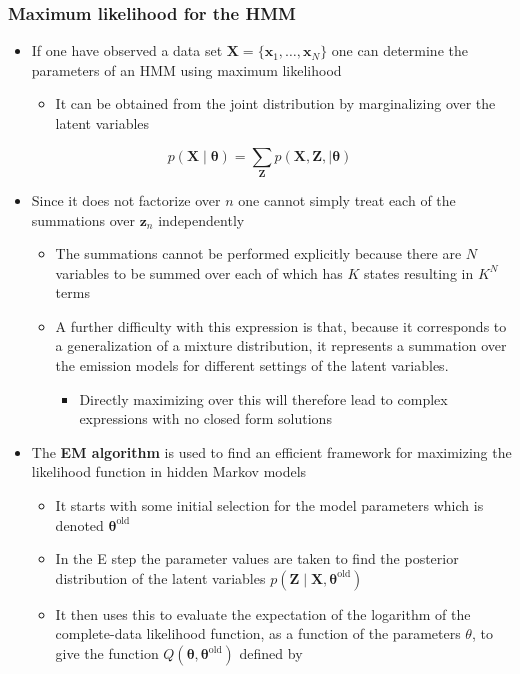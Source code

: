 \documentclass[11pt]{article}
\begin{document}
\subsubsection{Maximum likelihood for the HMM}
\label{sec:org84755cc}
\begin{itemize}
\item If one have observed a data set \(\pmb X = \{\pmb x_1, \dots, \pmb x_N\}\) one can determine the parameters of an HMM using maximum likelihood
\begin{itemize}
\item It can be obtained from the joint distribution by marginalizing over the latent variables
\end{itemize}
\end{itemize}
\begin{equation}
  p(\pmb X \mid \pmb \theta) = \sum_{\pmb Z} p(\pmb X, \pmb Z, \mid \pmb \theta)
\end{equation}
\begin{itemize}
\item Since it does not factorize over \(n\) one cannot simply treat each of the summations over \(\pmb z_n\) independently
\begin{itemize}
\item The summations cannot be performed explicitly because there are \(N\) variables to be summed over each of which has \(K\) states resulting in \(K^N\) terms
\item A further difficulty with this expression is that, because it corresponds to a generalization of a mixture distribution, it represents a summation over the emission models for different settings of the latent variables.
\begin{itemize}
\item Directly maximizing over this will therefore lead to complex expressions with no closed form solutions
\end{itemize}
\end{itemize}

\item The \textbf{EM algorithm} is used to find an efficient framework for maximizing the likelihood function in hidden Markov models
\begin{itemize}
\item It starts with some initial selection for the model parameters which is denoted \(\pmb \theta^\text{old}\)
\item In the E step the parameter values are taken to find the posterior distribution of the latent variables \(p(\pmb Z \mid \pmb X, \pmb \theta^\text{old})\)
\item It then uses this to evaluate the expectation of the logarithm of the complete-data likelihood function, as a function of the parameters \(\theta\), to give the function \(Q(\pmb \theta, \pmb \theta^\text{old})\) defined by
\end{itemize}
\end{itemize}
\end{document}
